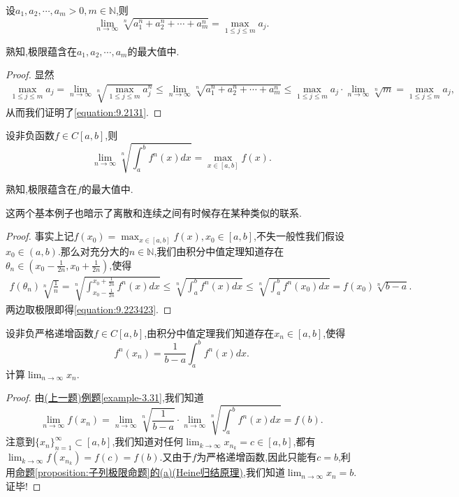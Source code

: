 \documentclass[../../main.tex]{subfiles}
\begin{document}
\begin{example}
设\(a_1,a_2,\cdots,a_m > 0,m \in \mathbb{N}\),则
\[
\lim_{n \to \infty} \sqrt[n]{a_1^n + a_2^n + \cdots + a_m^n} = \max_{1\leq j\leq m} a_j.
\]
\end{example} 
\begin{remark}
熟知,极限蕴含在\(a_1,a_2,\cdots,a_m\)的最大值中.
\end{remark}
\begin{proof}
显然
\begin{align}\label{equation:9.2131}
\max_{1\leq j\leq m} a_j = \lim_{n \to \infty} \sqrt[n]{\max_{1\leq j\leq m} a_j^n} \leq \lim_{n \to \infty} \sqrt[n]{a_1^n + a_2^n + \cdots + a_m^n} \leq \max_{1\leq j\leq m} a_j \cdot \lim_{n \to \infty} \sqrt[n]{m} = \max_{1\leq j\leq m} a_j,
\end{align}
从而我们证明了\eqref{equation:9.2131}.  
\end{proof}

\begin{example}\label{example-3.31}
设非负函数\(f \in C[a,b]\),则
\[
\lim_{n \to \infty} \sqrt[n]{\int_{a}^{b} f^n(x)dx} = \max_{x\in[a,b]} f(x).
\]
\end{example}
\begin{remark}
熟知,极限蕴含在\(f\)的最大值中. 
\end{remark}
\begin{note}
这两个基本例子也暗示了离散和连续之间有时候存在某种类似的联系.
\end{note}
\begin{proof}
事实上记\(f(x_0) = \max_{x\in[a,b]} f(x), x_0 \in [a,b]\),不失一般性我们假设\(x_0 \in (a,b)\).那么对充分大的\(n \in \mathbb{N}\),我们由积分中值定理知道存在\(\theta_n \in (x_0 - \frac{1}{2n}, x_0 + \frac{1}{2n})\),使得
\begin{align}\label{equation:9.223423}
f(\theta_n) \sqrt[n]{\frac{1}{n}} = \sqrt[n]{\int_{x_0 - \frac{1}{2n}}^{x_0 + \frac{1}{2n}} f^n(x)dx} \leq \sqrt[n]{\int_{a}^{b} f^n(x)dx} \leq \sqrt[n]{\int_{a}^{b} f^n(x_0)dx} = f(x_0) \sqrt[n]{b - a}.   
\end{align}
两边取极限即得\eqref{equation:9.223423}.
\end{proof}

\begin{example}
设非负严格递增函数\(f \in C[a,b]\),由积分中值定理我们知道存在\(x_n \in [a,b]\),使得
\[
f^n(x_n) = \frac{1}{b - a} \int_{a}^{b} f^n(x)dx.
\]
计算\(\lim_{n \to \infty} x_n\).
\end{example}
\begin{proof}
由\hyperref[example-3.31]{(上一题)例题\ref{example-3.31}},我们知道
\[
\lim_{n \to \infty} f(x_n) = \lim_{n \to \infty} \sqrt[n]{\frac{1}{b - a}} \cdot \lim_{n \to \infty} \sqrt[n]{\int_{a}^{b} f^n(x)dx} = f(b).
\]
注意到\(\{x_n\}_{n = 1}^{\infty} \subset [a,b]\),我们知道对任何\(\lim_{k \to \infty} x_{n_k} = c \in [a,b]\),都有\(\lim_{k \to \infty} f(x_{n_k}) = f(c) = f(b)\).又由于$f$为严格递增函数,因此只能有\(c = b\),利用\hyperref[proposition:子列极限命题]{命题\ref{proposition:子列极限命题}的(a)(Heine归结原理)},我们知道\(\lim_{n \to \infty} x_n = b\).证毕!
\end{proof}
\end{document}
